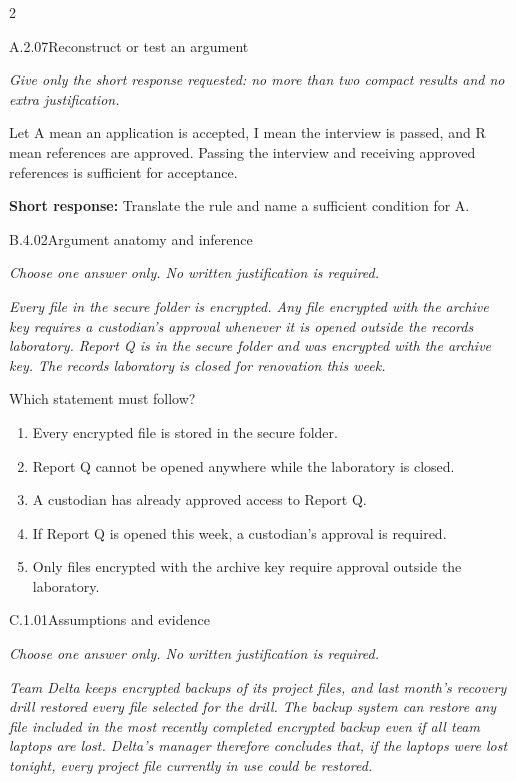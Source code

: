 \documentclass[9pt]{extarticle}
\newcommand{\choice}[1]{\item #1}
\begin{document}
\begin{multicols}{2}
\begin{DenseCoreProblem}{A.2.07}{Reconstruct or test an argument}
{\scriptsize\textit{Give only the short response requested: no more than two compact results and no extra justification.}\par}
Let A mean an application is accepted, I mean the interview is passed, and R mean references are approved. Passing the interview and receiving approved references is sufficient for acceptance.

\textbf{Short response:} Translate the rule and name a sufficient condition for A.
\end{DenseCoreProblem}
\begin{DenseCoreProblem}{B.4.02}{Argument anatomy and inference}
{\scriptsize\textit{Choose one answer only. No written justification is required.}\par}
\emph{Every file in the secure folder is encrypted. Any file encrypted with the archive key requires a custodian's approval whenever it is opened outside the records laboratory. Report Q is in the secure folder and was encrypted with the archive key. The records laboratory is closed for renovation this week.}

Which statement must follow?
\begin{enumerate}[label=(\alph*)]
  \choice{Every encrypted file is stored in the secure folder.}
  \choice{Report Q cannot be opened anywhere while the laboratory is closed.}
  \choice{A custodian has already approved access to Report Q.}
  \choice{If Report Q is opened this week, a custodian's approval is required.}
  \choice{Only files encrypted with the archive key require approval outside the laboratory.}
\end{enumerate}
\end{DenseCoreProblem}
\columnbreak
\begin{DenseCoreProblem}{C.1.01}{Assumptions and evidence}
{\scriptsize\textit{Choose one answer only. No written justification is required.}\par}
\emph{Team Delta keeps encrypted backups of its project files, and last month's recovery drill restored every file selected for the drill. The backup system can restore any file included in the most recently completed encrypted backup even if all team laptops are lost. Delta's manager therefore concludes that, if the laptops were lost tonight, every project file currently in use could be restored.}


\end{DenseCoreProblem}
\end{multicols}
\end{document}
